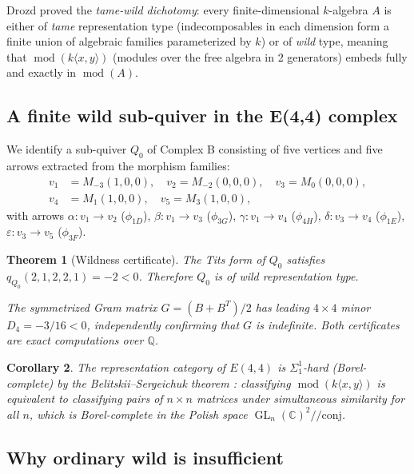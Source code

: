 \documentclass[reqno,10pt]{amsart}
\theoremstyle{plain}
\newtheorem{theorem}{Theorem}[section]
\newtheorem{corollary}[theorem]{Corollary}
\theoremstyle{definition}
\def\CC{{\mathbb{C}}}
\def\QQ{{\mathbb{Q}}}
\def\gE{E(4,4)}
\begin{document}
Drozd \cite{Drozd1979} proved the \emph{tame-wild dichotomy}: every
finite-dimensional $k$-algebra $A$ is either of \emph{tame} representation
type (indecomposables in each dimension form a finite union of algebraic
families parameterized by $k$) or of \emph{wild} type, meaning that
$\operatorname{mod}(k\langle x,y\rangle)$ (modules over the free algebra in
2 generators) embeds fully and exactly in $\operatorname{mod}(A)$.

\subsection{A finite wild sub-quiver in the E(4,4) complex}

We identify a sub-quiver $Q_0$ of Complex B consisting of five vertices
and five arrows extracted from the morphism families:
\begin{align*}
  v_1 &= M_{-3}(1,0,0), \quad v_2 = M_{-2}(0,0,0), \quad v_3 = M_0(0,0,0),\\
  v_4 &= M_1(1,0,0), \quad v_5 = M_3(1,0,0),
\end{align*}
with arrows $\alpha: v_1 \to v_2$ ($\phi_{1D}$), $\beta: v_1 \to v_3$
($\phi_{3G}$), $\gamma: v_1 \to v_4$ ($\phi_{4H}$), $\delta: v_3 \to v_4$
($\phi_{1E}$), $\varepsilon: v_3 \to v_5$ ($\phi_{3F}$).

\begin{theorem}[Wildness certificate]\label{thm:wild}
  The Tits form of $Q_0$ satisfies $q_{Q_0}(2,1,2,2,1) = -2 < 0$.
  Therefore $Q_0$ is of wild representation type.

  The symmetrized Gram matrix $G = (B + B^T)/2$ has leading $4\times 4$
  minor $D_4 = -3/16 < 0$, independently confirming that $G$ is indefinite.
  Both certificates are exact computations over $\QQ$.
\end{theorem}

\begin{corollary}
  The representation category of $\gE$ is $\Sigma_1^1$-hard (Borel-complete)
  by the Belitskii--Sergeichuk theorem \cite{BS2000}: classifying
  $\operatorname{mod}(k\langle x,y\rangle)$ is equivalent to classifying pairs
  of $n\times n$ matrices under simultaneous similarity for all $n$, which is
  Borel-complete in the Polish space $\operatorname{GL}_n(\CC)^2 /\!\!/ \mathrm{conj}$.
\end{corollary}

\subsection{Why ordinary wild is insufficient}
\end{document}
